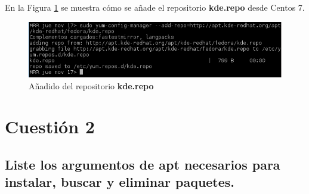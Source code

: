 En la Figura \ref{fig:figura4} se muestra cómo se añade el repositorio \textbf{kde.repo} desde Centos 7.

\begin{figure}[H] %
	\centering
	\includegraphics[scale=0.7]{figuras/figura4.png} 
	\caption{Añadido del repositorio \textbf{kde.repo}} 
	\label{fig:figura4}
\end{figure}

\newpage


\section{Cuestión 2}
\subsection{Liste los argumentos de apt necesarios para instalar, buscar
	y eliminar paquetes.}

